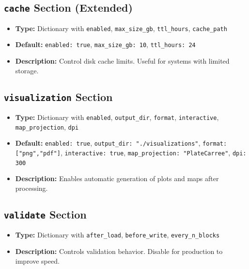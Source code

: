 \documentclass[12pt,a4paper]{article}
\begin{document}
\subsection{\texttt{cache} Section (Extended)}
\begin{itemize}[leftmargin=*]
    \item \textbf{Type:} Dictionary with \texttt{enabled}, \texttt{max\_size\_gb}, \texttt{ttl\_hours}, \texttt{cache\_path}
    \item \textbf{Default:} \texttt{enabled: true}, \texttt{max\_size\_gb: 10}, \texttt{ttl\_hours: 24}
    \item \textbf{Description:} Control disk cache limits. Useful for systems with limited storage.
\end{itemize}

\subsection{\texttt{visualization} Section}
\begin{itemize}[leftmargin=*]
    \item \textbf{Type:} Dictionary with \texttt{enabled}, \texttt{output\_dir}, \texttt{format}, \texttt{interactive}, \texttt{map\_projection}, \texttt{dpi}
    \item \textbf{Default:} \texttt{enabled: true}, \texttt{output\_dir: "./visualizations"}, \texttt{format: ["png","pdf"]}, \texttt{interactive: true}, \texttt{map\_projection: "PlateCarree"}, \texttt{dpi: 300}
    \item \textbf{Description:} Enables automatic generation of plots and maps after processing.
\end{itemize}

\subsection{\texttt{validate} Section}
\begin{itemize}[leftmargin=*]
    \item \textbf{Type:} Dictionary with \texttt{after\_load}, \texttt{before\_write}, \texttt{every\_n\_blocks}
    \item \textbf{Description:} Controls validation behavior. Disable for production to improve speed.
\end{itemize}

\end{document}
